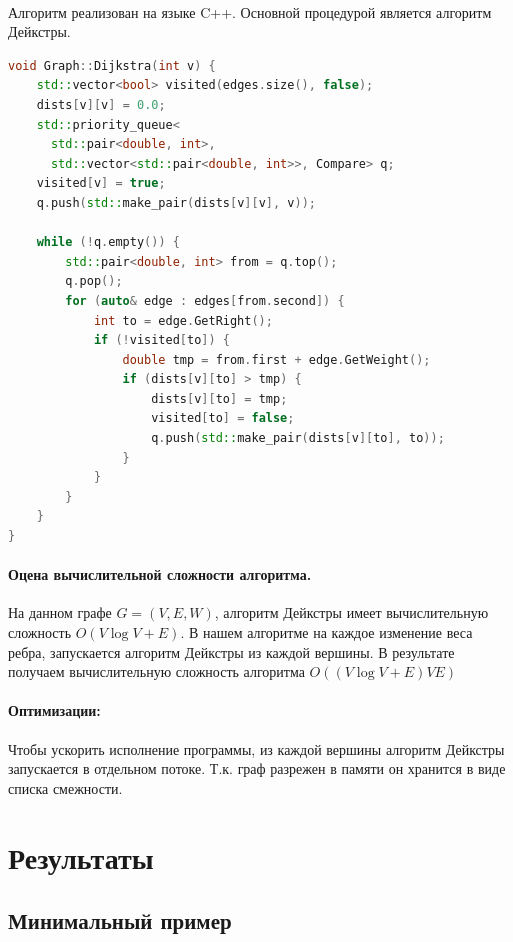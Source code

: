 \documentclass[12pt]{article}
\begin{document}
\paragraph{}
Алгоритм реализован на языке C++. Основной процедурой является
алгоритм Дейкстры\cite{dijkstra}.


\begin{lstlisting}[language=C++]
void Graph::Dijkstra(int v) {
    std::vector<bool> visited(edges.size(), false);
    dists[v][v] = 0.0;
    std::priority_queue<
      std::pair<double, int>,
      std::vector<std::pair<double, int>>, Compare> q;
    visited[v] = true;
    q.push(std::make_pair(dists[v][v], v));

    while (!q.empty()) {
        std::pair<double, int> from = q.top();
        q.pop();
        for (auto& edge : edges[from.second]) {
            int to = edge.GetRight();
            if (!visited[to]) {
                double tmp = from.first + edge.GetWeight();
                if (dists[v][to] > tmp) {
                    dists[v][to] = tmp;
                    visited[to] = false;
                    q.push(std::make_pair(dists[v][to], to));
                }
            }
        }
    }
}
\end{lstlisting}

\paragraph{Оцена вычислительной сложности алгоритма.}

На данном графе $G = (V, E, W)$, алгоритм Дейкстры имеет вычислительную  сложность $O(V \log V + E) $.
В нашем алгоритме на каждое изменение веса ребра, запускается алгоритм Дейкстры из каждой вершины. В результате получаем 
вычислительную сложность алгоритма $O((V \log V + E)VE)$

\paragraph{Оптимизации:}
Чтобы ускорить исполнение программы, из каждой
вершины алгоритм Дейкстры запускается в отдельном
потоке. Т.к. граф разрежен в памяти он хранится в
виде списка смежности.

\section{Результаты}

\subsection{Минимальный пример}
\end{document}

